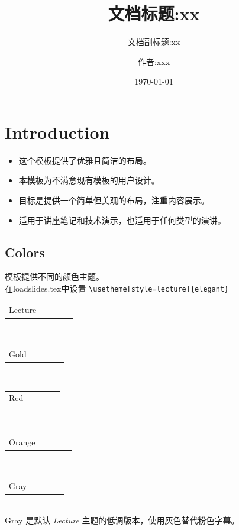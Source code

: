 \documentclass[
    11pt,
    notheorems,
    hyperref={pdfauthor=whatever}
]{beamer}
\title{文档标题:xx}
\subtitle{文档副标题:xx}
\author{作者:xxx}
\date{\today}
\begin{document}
\maketitleframe
\maketocframe


\section{Introduction}

\begin{frame}
    \begin{itemize}
        \item 这个模板提供了优雅且简洁的布局。
        \item 本模板为不满意现有模板的用户设计。
        \item 目标是提供一个简单但美观的布局，注重内容展示。
        \item 适用于讲座笔记和技术演示，也适用于任何类型的演讲。
    \end{itemize}
\end{frame}

\subsection{Colors}
\begin{frame}[fragile]
    \centering
    模板提供不同的颜色主题。\\
    在loadslides.tex中设置 \verb+\usetheme[style=lecture]{elegant}+\\[0.8cm]
    \newcommand{\colorRow}[1]{
        \begin{tabular}{p{4cm}cccc}
        #1 & \cellcolor{primary}\hspace*{1cm} &\cellcolor{secondary}\hspace*{1cm}&\cellcolor{tertiary}\hspace*{1cm}\\
        \end{tabular}
    }
    \colorRow{Lecture}\\[0.3cm]
    \colorRow{Gold}\\[0.3cm]
    \colorRow{Red}\\[0.3cm]
    \colorRow{Orange}\\[0.3cm]
    \colorRow{Gray}\\[0.3cm]

    \centering Gray 是默认 \textit{Lecture} 主题的低调版本，使用灰色替代粉色字幕。
\end{frame}
\end{document}
